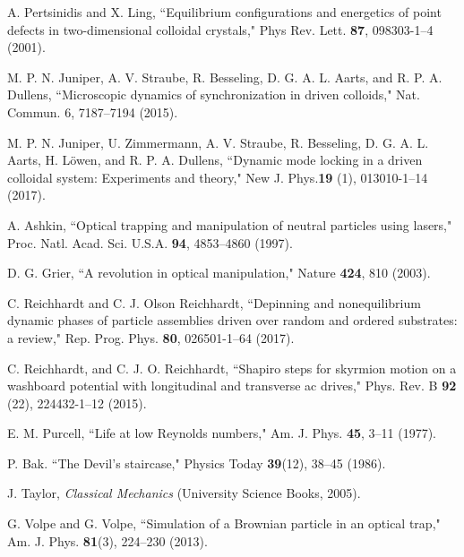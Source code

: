 \documentclass[preprint,showpacs,preprintnumbers,amsmath,amssymb,aps,prb]{revtex4-1}
\theoremstyle{remark}
\begin{document}
\begin{thebibliography}{99}
    
   A. Pertsinidis and X. Ling,  ``Equilibrium configurations and energetics of point defects in two-dimensional colloidal crystals," Phys Rev. Lett.  {\bf 87}, 098303-1--4 (2001). %

   M. P. N. Juniper, A. V. Straube, R. Besseling, D. G. A. L. Aarts, and R. P. A. Dullens, ``Microscopic dynamics of synchronization in driven colloids," Nat. Commun. 6, 7187--7194 (2015). 
      
   M. P. N. Juniper,  U. Zimmermann, A. V. Straube, R. Besseling, D. G. A. L. Aarts, H. L{\"o}wen, and R. P. A. Dullens,  ``Dynamic mode locking in a driven colloidal system: Experiments and theory," New J. Phys.{\bf 19} (1), 013010-1--14 (2017).  %

   A. Ashkin, ``Optical trapping and manipulation of neutral particles using lasers," Proc. Natl. Acad. Sci. U.S.A. {\bf 94}, 4853--4860 (1997).

   D. G. Grier, ``A revolution in optical manipulation," Nature {\bf 424}, 810 (2003).

   C. Reichhardt and C. J. Olson Reichhardt, ``Depinning and nonequilibrium dynamic phases of particle assemblies driven over random and ordered substrates: a review," Rep. Prog. Phys. {\bf 80}, 026501-1--64 (2017). %

   C. Reichhardt, and C. J. O. Reichhardt,  ``Shapiro steps for skyrmion motion on a washboard potential with longitudinal and transverse ac drives," Phys. Rev. B {\bf 92} (22), 224432-1--12 (2015).      

   E. M. Purcell, ``Life at low Reynolds numbers,"  Am. J. Phys. {\bf 45}, 3--11 (1977).
  
   P. Bak. ``The Devil's staircase," Physics Today {\bf 39}(12), 38--45 (1986).

   J. Taylor,  {\it Classical Mechanics} (University Science Books, 2005).

   G. Volpe and G. Volpe, ``Simulation of a Brownian particle in an optical trap,"  Am. J. Phys. {\bf 81}(3), 224--230 (2013).


\end{thebibliography}
\end{document}
